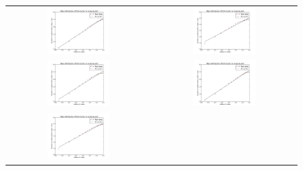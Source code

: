 \documentclass[a4paper,12pt]{article}
\begin{document}
\begin{figure}[htb]
\centering
	\begin{tabular}{@{}cc@{}}
		\includegraphics[width = 0.45\textwidth]{pics/Fractal_dimension_final_1.pdf} &
		\includegraphics[width = 0.45\textwidth]{pics/Fractal_dimension_final_2.pdf} \\
		\includegraphics[width = 0.45\textwidth]{pics/Fractal_dimension_final_3.pdf} &
		\includegraphics[width = 0.45\textwidth]{pics/Fractal_dimension_final_4.pdf} \\
		\includegraphics[width = 0.45\textwidth]{pics/Fractal_dimension_final_5.pdf} &

\end{tabular}
\end{figure}
\end{document}
